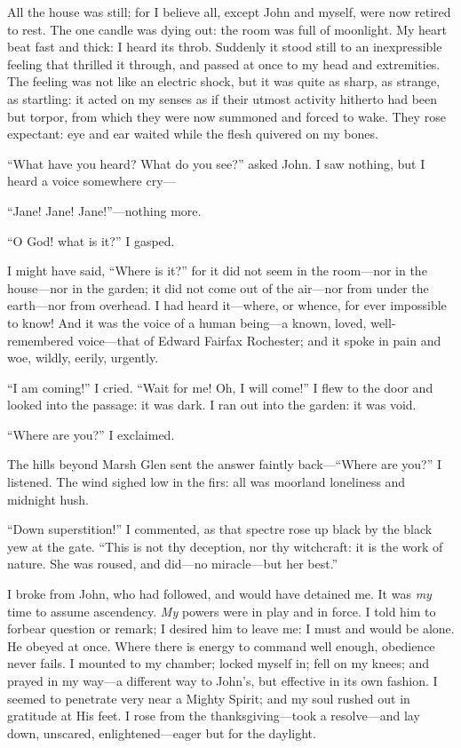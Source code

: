 All the house was still; for I believe all, except \St{} John and myself,
were now retired to rest. The one candle was dying out: the room was
full of moonlight. My heart beat fast and thick: I heard its throb.
Suddenly it stood still to an inexpressible feeling that thrilled it
through, and passed at once to my head and extremities. The feeling was
not like an electric shock, but it was quite as sharp, as strange, as
startling: it acted on my senses as if their utmost activity hitherto
had been but torpor, from which they were now summoned and forced to
wake. They rose expectant: eye and ear waited while the flesh quivered
on my bones.

\enquote{What have you heard? What do you see?} asked \St{} John. I saw
nothing, but I heard a voice somewhere cry---

\enquote{Jane! Jane! Jane!}---nothing more.

\enquote{O God! what is it?} I gasped.

I might have said, \enquote{Where is it?} for it did not seem in the
room---nor in the house---nor in the garden; it did not come out of the
air---nor from under the earth---nor from overhead. I had heard
it---where, or whence, for ever impossible to know! And it was the
voice of a human being---a known, loved, well-remembered voice---that of
Edward Fairfax Rochester; and it spoke in pain and woe, wildly, eerily,
urgently.

\enquote{I am coming!} I cried. \enquote{Wait for me! Oh, I will
	come!} I flew to the door and looked into the passage: it was dark. I
ran out into the garden: it was void.

\enquote{Where are you?} I exclaimed.

The hills beyond Marsh Glen sent the answer faintly
back---\enquote{Where are you?} I listened. The wind sighed low in the
firs: all was moorland loneliness and midnight hush.

\enquote{Down superstition!} I commented, as that spectre rose up black
by the black yew at the gate. \enquote{This is not thy deception, nor
	thy witchcraft: it is the work of nature. She was roused, and did---no
	miracle---but her best.}

I broke from \St{} John, who had followed, and would have detained me. It
was \emph{my} time to assume ascendency. \emph{My} powers were in play
and in force. I told him to forbear question or remark; I desired him
to leave me: I must and would be alone. He obeyed at once. Where there
is energy to command well enough, obedience never fails. I mounted to
my chamber; locked myself in; fell on my knees; and prayed in my way---a
different way to \St{} John's, but effective in its own fashion. I seemed
to penetrate very near a Mighty Spirit; and my soul rushed out in
gratitude at His feet. I rose from the thanksgiving---took a
resolve---and lay down, unscared, enlightened---eager but for the
daylight.
